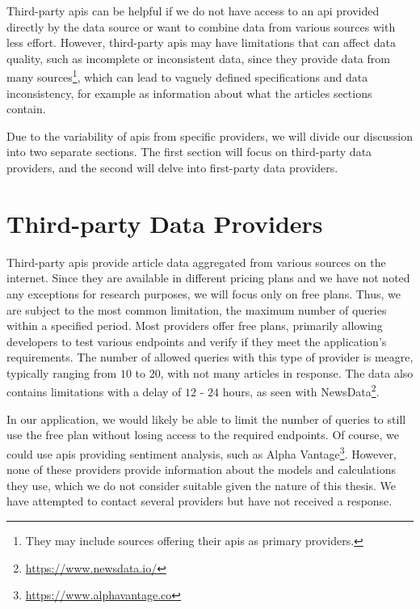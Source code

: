 Third-party \acrshort{api}s can be helpful if we do not have access to an \acrshort{api} provided directly by the data source or want to combine data from various sources with less effort. However, third-party \acrshort{api}s may have limitations that can affect data quality, such as incomplete or inconsistent data, since they provide data from many sources\footnote{They may include sources offering their \acrshort{api}s as primary providers.}, which can lead to vaguely defined specifications and data inconsistency, for example as information about what the articles sections contain.

Due to the variability of \acrshort{api}s from specific providers, we will divide our discussion into two separate sections. The first section will focus on third-party data providers, and the second will delve into first-party data providers.

\section{Third-party Data Providers}
\label{sec:textual-data-third-party-data-providers}
Third-party \acrshort{api}s provide article data aggregated from various sources on the internet. Since they are available in different pricing plans and we have not noted any exceptions for research purposes, we will focus only on free plans. Thus, we are subject to the most common limitation, the maximum number of queries within a specified period. Most providers offer free plans, primarily allowing developers to test various endpoints and verify if they meet the application's requirements. The number of allowed queries with this type of provider is meagre, typically ranging from $10$ to $20$, with not many articles in response. The data also contains limitations with a delay of $12$ - $24$ hours, as seen with NewsData\footnote{\href{https://www.newsdata.io/}{https://www.newsdata.io/}}.

In our application, we would likely be able to limit the number of queries to still use the free plan without losing access to the required endpoints. Of course, we could use \acrshort{api}s providing sentiment analysis, such as Alpha Vantage\footnote{\href{https://www.alphavantage.co}{https://www.alphavantage.co}}. However, none of these providers provide information about the models and calculations they use, which we do not consider suitable given the nature of this thesis. We have attempted to contact several providers but have not received a response.

